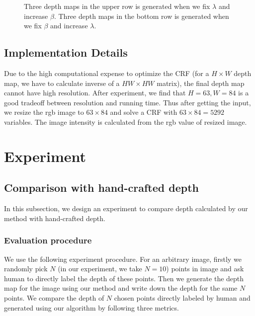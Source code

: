 \documentclass[10pt,twocolumn,letterpaper]{article}
\begin{document}
\begin{figure}[!ht]
\begin{center}
\end{center}
   \caption{Three depth maps in the upper row is generated when we fix $\lambda$ and increase $\beta$. Three depth maps in the bottom row is generated when we fix $\beta$ and increase $\lambda$.}
\label{fig:short}
\end{figure} 

\subsection {Implementation Details}
Due to the high computational expense to optimize the CRF (for a $H \times W$ depth map, we have to calculate inverse of a $HW \times HW$ matrix), the final depth map cannot have high resolution. After experiment, we find that $H=63, W=84$ is a good tradeoff between resolution and running time. Thus after getting the input, we resize the rgb image to $63 \times 84$ and solve a CRF with $63 \times 84 = 5292$ variables. The image intensity is calculated from the rgb value of resized image.


\section{Experiment}
\subsection{Comparison with hand-crafted depth}
In this subsection, we design an experiment to compare depth calculated by our method with hand-crafted depth. 
\subsubsection{Evaluation procedure}
\text{\ \ \ \ }We use the following experiment procedure. For an arbitrary image, firstly we randomly pick $N$ (in our experiment, we take $N = 10$) points in image and ask human to directly label the depth of these points. Then we generate the depth map for the image using our method and write down the depth for the same $N$ points. We compare the depth of $N$ chosen points directly labeled by human and generated using our algorithm by following three metrics.
\end{document}
